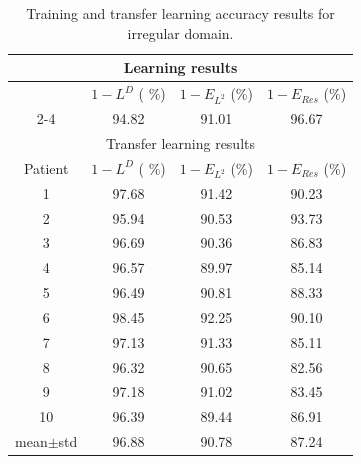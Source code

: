 \documentclass[preprint,12pt]{elsarticle}
\theoremstyle{plain}
\numberwithin{figure}{section}
\numberwithin{table}{section}
\begin{document}
\begin{table}[!htbp]
	\centering
	\caption{Training and transfer learning accuracy results for irregular domain.}
	\begin{tabular}{c|ccc}
		\hline
		\multicolumn{4}{c}{Learning results}\\
		\hline
		& $1-L^D$ ( \%)& $1-E_{L^2}$  (\%) & $1-E_{Res}$ (\%)\\
		\cline{2-4}
		& 94.82 & 91.01 & 96.67\\
		\hline
		\multicolumn{4}{c}{Transfer learning results}\\
		\hline
		Patient & $1-L^D$ ( \%)& $1-E_{L^2}$  (\%) & $1-E_{Res}$ (\%)\\
		\hline
		1 & 97.68 & 91.42 & 90.23 \\
		2 & 95.94 & 90.53 & 93.73 \\
		3 & 96.69 & 90.36 & 86.83 \\
		4 & 96.57 & 89.97 & 85.14 \\
		5 & 96.49 & 90.81 & 88.33 \\
		6 & 98.45 & 92.25 & 90.10 \\
		7 & 97.13 & 91.33 & 85.11 \\
		8 & 96.32 & 90.65 & 82.56 \\
		9 & 97.18 & 91.02 & 83.45 \\
		10 & 96.39 & 89.44 & 86.91 \\
		\hline
		mean$\pm$std
		& 96.88 & 90.78 & 87.24 \\
		\hline
	\end{tabular}
	\label{tab:ct}
\end{table}
\end{document}
